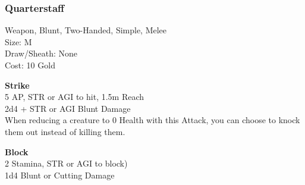 \subsubsection{Quarterstaff}\label{weapon:quarterstaff}
Weapon, Blunt, Two-Handed, Simple, Melee\\
Size: M\\
Draw/Sheath: None\\
Cost: 10 Gold

\textbf{Strike}\\
5 AP, STR or AGI to hit, 1.5m Reach\\
2d4 + \texttimes STR or AGI Blunt Damage\\
When reducing a creature to 0 Health with this Attack, you can choose to knock them out instead of killing them.

\textbf{Block}\\
2 Stamina, STR or AGI to block)\\
1d4 Blunt or Cutting Damage


